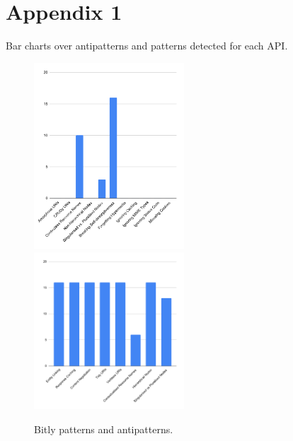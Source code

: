 
\section{Appendix 1} 

Bar charts over antipatterns and patterns detected for each API.

\begin{figure}[htb!]

\includegraphics[width=0.5\textwidth]{img/barchart/bitlyBarAnti.pdf}
\includegraphics[width=0.5\textwidth]{img/barchart/bitlyBarPatt.pdf}
\caption{Bitly patterns and antipatterns.}
\label{fig:bitlyBarPatt}

\end{figure}

